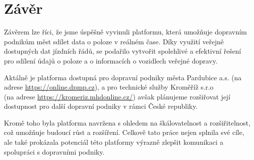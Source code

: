 \chapter{Závěr}
Závěrem lze říci, že jsme úspěšně vyvinuli platformu, která umožňuje dopravním podnikům měst sdílet data o poloze v reálném čase.
Díky využití veřejně dostupných dat jízdních řádů, se podařilo vytvořit spolehlivé a efektivní řešení pro sdílení údajů o poloze a o informacích o vozidlech veřejné dopravy.\par 
Aktálně je platforma dostupná pro dopravní podniky města Pardubice a.s. (na adrese \href{https://online.dpmp.cz}{https://online.dpmp.cz}), a pro technické služby Kroměříž s.r.o 
\\ (na adrese \href{https://kromeriz.mhdonline.cz/}{https://kromeriz.mhdonline.cz/}) avšak plánujeme rozšiřovat její dostupnost pro další dopravní podniky v rámci České republiky.\par 
Kromě toho byla platforma navržena s ohledem na škálovatelnost a rozšiřitelnost, což umožňuje budoucí růst a rozšíření. Celkově tato práce nejen splnila své cíle, ale také prokázala potenciál této platformy výrazně zlepšit komunikaci a spolupráci s dopravními podniky.